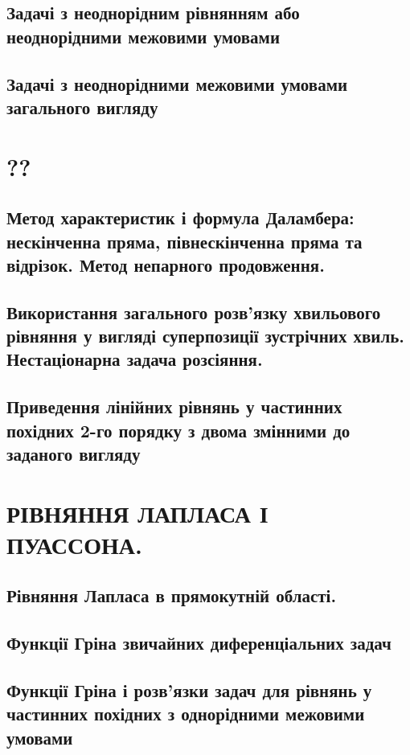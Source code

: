 \documentclass[a4paper, 14pt]{extreport}
\begin{document}
\chapter{Задачі з неоднорідним рівнянням або неоднорідними межовими умовами}

\vspace{2cm}


\chapter{Задачі з неоднорідними межовими умовами загального вигляду}




\part{??}
\chapter{Метод характеристик і формула Даламбера: нескінченна пряма, півнескінченна пряма та відрізок. Метод непарного продовження.}




\chapter{Використання загального розв’язку хвильового рівняння у вигляді суперпозиції зустрічних хвиль. Нестаціонарна задача розсіяння.}



\chapter{Приведення лінійних рівнянь у частинних похідних 2-го порядку з двома змінними до заданого вигляду}




\part{РІВНЯННЯ ЛАПЛАСА І ПУАССОНА.}

\chapter{Рівняння Лапласа в прямокутній області.}



\chapter{Функції Гріна звичайних диференціальних задач}


%

\chapter{Функції Гріна і розв’язки задач для рівнянь у частинних похідних з однорідними межовими умовами}



\end{document}
